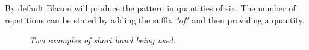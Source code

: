 By default Blazon will produce the pattern in quantities of six.  The number of repetitions can be stated by adding the suffix \emph{"of"} and then providing a quantity.  

\begin{figure}[H]
\hfill
{}
\hfill

\caption{\emph{Two examples of short hand being used.}}

\end{figure}





